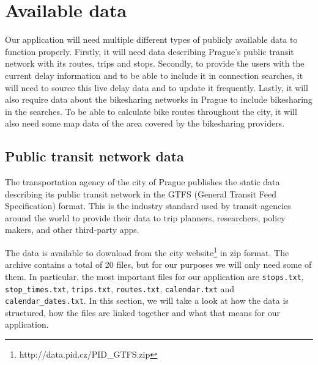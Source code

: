 \section{Available data}

Our application will need multiple different types of publicly available data to function properly. Firstly, it will need data describing Prague's public transit network with its routes, trips and stops. Secondly, to provide the users with the current delay information and to be able to include it in connection searches, it will need to source this live delay data and to update it frequently. Lastly, it will also require data about the bikesharing networks in Prague to include bikesharing in the searches. To be able to calculate bike routes throughout the city, it will also need some map data of the area covered by the bikesharing providers.

\subsection{Public transit network data}

The transportation agency of the city of Prague publishes the static data describing its public transit network in the GTFS (General Transit Feed Specification) format. This is the industry standard used by transit agencies around the world to provide their data to trip planners, researchers, policy makers, and other third-party apps\cite{gtfs2024}.

The data is available to download from the city website\footnote{http://data.pid.cz/PID\_GTFS.zip} in zip format. The archive contains a total of 20 files, but for our purposes we will only need some of them. In particular, the most important files for our application are \texttt{stops.txt}, \texttt{stop\_times.txt}, \texttt{trips.txt}, \texttt{routes.txt}, \texttt{calendar.txt} and \texttt{calendar\_dates.txt}. In this section, we will take a look at how the data is structured, how the files are linked together and what that means for our application.

